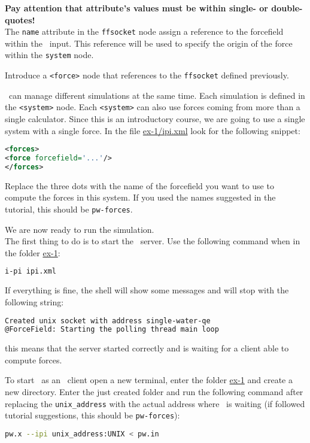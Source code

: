 \documentclass{article}
\begin{document}
\begin{Exercise}[label={i-pi},title={Molecular Dynamics: a client/server approach}]
\textbf{Pay attention that attribute's values must be within single- or
double-quotes!}\\


The \texttt{name} attribute in the \texttt{ffsocket} node assign a
reference to the forcefield within the \ipi\ input. This reference
will be used to specify the origin of the force within the
\texttt{system} node.

\Question
Introduce a \texttt{<force>} node that references to the
\texttt{ffsocket} defined previously.

\ipi\ can manage different simulations at the same time. Each
simulation is defined in the \texttt{<system>} node. Each
\texttt{<system>} can also use forces coming from more than a single
calculator. Since this is an introductory course, we are going to use
a single system with a single force. In the file \url{ex-1/ipi.xml}
look for the following snippet:
\begin{lstlisting}[language=xml]
<forces>
<force forcefield='...'/>
</forces>
\end{lstlisting}
Replace the three dots with the name of the forcefield you want to use
to compute the forces in this system. If you used the names suggested
in the tutorial, this should be \texttt{pw-forces}.

\Question
We are now ready to run the simulation.\\

The first thing to do is to start the \ipi\ server. Use the following
command when in the folder \url{ex-1}:
\begin{lstlisting}[language=bash]
i-pi ipi.xml
\end{lstlisting}
If everything is fine, the shell will show some messages and will stop
with the following string:
\begin{lstlisting}[language=bash]
Created unix socket with address single-water-qe
@ForceField: Starting the polling thread main loop
\end{lstlisting}
this means that the server started correctly and is waiting for a
client able to compute forces.

To start \pwx\ as an \ipi\ client open a new terminal, enter the
folder \url{ex-1} and create a new directory. Enter the just
created folder and run the
following command after replacing the \texttt{unix\_address} with the
actual address where \ipi\ is waiting (if followed tutorial
suggestions, this should be \texttt{pw-forces}):
\begin{lstlisting}[language=bash]
pw.x --ipi unix_address:UNIX < pw.in
\end{lstlisting}



\end{Exercise}
\end{document}
